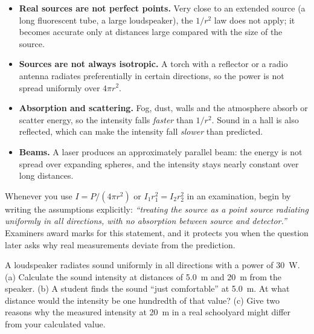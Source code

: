 \documentclass[11pt]{article}
\begin{document}
\begin{attention}
\begin{itemize}
\item \textbf{Real sources are not perfect points.} Very close to an extended source (a long fluorescent tube, a large loudspeaker), the $1/r^{2}$ law does not apply; it becomes accurate only at distances large compared with the size of the source.
\item \textbf{Sources are not always isotropic.} A torch with a reflector or a radio antenna radiates preferentially in certain directions, so the power is not spread uniformly over $4\pi r^{2}$.
\item \textbf{Absorption and scattering.} Fog, dust, walls and the atmosphere absorb or scatter energy, so the intensity falls \emph{faster} than $1/r^{2}$. Sound in a hall is also reflected, which can make the intensity fall \emph{slower} than predicted.
\item \textbf{Beams.} A laser produces an approximately parallel beam: the energy is not spread over expanding spheres, and the intensity stays nearly constant over long distances.
\end{itemize}
\end{attention}

\begin{methode}
Whenever you use $I = P/(4\pi r^{2})$ or $I_1 r_1^{2} = I_2 r_2^{2}$ in an examination, begin by writing the assumptions explicitly: \emph{``treating the source as a point source radiating uniformly in all directions, with no absorption between source and detector.''} Examiners award marks for this statement, and it protects you when the question later asks why real measurements deviate from the prediction.
\end{methode}

\begin{exercice}
A loudspeaker radiates sound uniformly in all directions with a power of \SI{30}{W}. (a) Calculate the sound intensity at distances of \SI{5.0}{m} and \SI{20}{m} from the speaker. (b) A student finds the sound ``just comfortable'' at \SI{5.0}{m}. At what distance would the intensity be one hundredth of that value? (c) Give two reasons why the measured intensity at \SI{20}{m} in a real schoolyard might differ from your calculated value.
\end{exercice}
\end{document}
